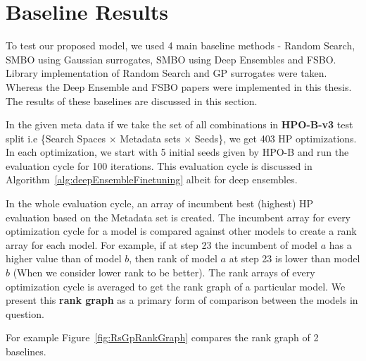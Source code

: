 \documentclass[12pt, twoside, ngerman]{report}
\begin{document}

\section{Baseline Results}

To test our proposed model,  we used 4 main baseline methods - Random Search,  SMBO using Gaussian surrogates,  SMBO using Deep Ensembles and FSBO.
Library implementation of Random Search and GP surrogates were taken.
Whereas the Deep Ensemble and FSBO papers were implemented in this thesis.
The results of these baselines are discussed in this section.

In the given meta data if we take the set of all combinations in \textbf{HPO-B-v3} test split i.e \{Search Spaces $\times$ Metadata sets $\times$ Seeds\},  we get 403 HP optimizations.
In each optimization,  we start with 5 initial seeds given by HPO-B and run the evaluation cycle for 100 iterations.
This evaluation cycle is discussed in Algorithm~\ref{alg:deepEnsembleFinetuning} albeit for deep ensembles.

In the whole evaluation cycle,  an array of incumbent best (highest) HP evaluation based on the Metadata set is created.
The incumbent array for every optimization cycle for a model is compared against other models to create a rank array for each model.
For example,  if at step 23 the incumbent of model $a$ has a higher value than of model $b$,  then rank of model $a$ at step 23 is lower than model $b$ (When we consider lower rank to be better).
The rank arrays of every optimization cycle is averaged to get the rank graph of a particular model.
We present this \textbf{rank graph} as a primary form of comparison between the models in question.

For example Figure~\ref{fig:RsGpRankGraph} compares the rank graph of 2 baselines.
\end{document}
